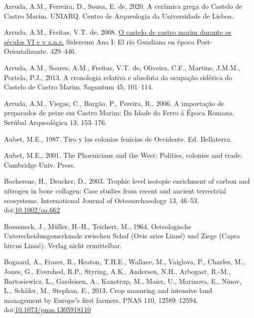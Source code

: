 \documentclass[review]{elsarticle} %
\newlength{\cslhangindent}
\newenvironment{CSLReferences}[2] %
 {%
  \setlength{\parindent}{0pt}
  \ifodd #1 \everypar{\setlength{\hangindent}{\cslhangindent}}\ignorespaces\fi
  \ifnum #2 > 0
  \setlength{\parskip}{#2\baselineskip}
  \fi
 }%
 {}
\begin{document}
\begin{CSLReferences}{1}{0}
\leavevmode{}%
Arruda, A.M., Ferreira, D., Sousa, E. de, 2020. A cerâmica grega do {Castelo} de {Castro Marim}. {UNIARQ. Centro de Arqueologia da Universidade de Lisboa}.

\leavevmode{}%
Arruda, A.M., Freitas, V.T. de, 2008. \href{https://repositorio.ul.pt/handle/10451/9778}{O castelo de castro marim durante os séculos VI e v a.n.e.} Sidereum Ana I: El río Guadiana en época Post-Orientalizante. 429--446.

\leavevmode{}%
Arruda, A.M., Soares, A.M., Freitas, V.T. de, Oliveira, C.F., Martins, J.M.M., Portela, P.J., 2013. A cronologia relativa e absoluta da ocupação sidérica do {Castelo} de {Castro Marim}. Saguntum 45, 101--114.

\leavevmode{}%
Arruda, A.M., Viegas, C., Bargão, P., Pereira, R., 2006. A importação de preparados de peixe em {Castro Marim}: Da {Idade} do {Ferro} á {Época Romana}. Setúbal Arqueológica 13, 153--176.

\leavevmode{}%
Aubet, M.E., 1987. Tiro y las colonias fenicias de {Occidente}. {Ed. Bellaterra}.

\leavevmode{}%
Aubet, M.E., 2001. The {Phoenicians} and the {West}: Politics, colonies and trade. {Cambridge Univ. Press}.

\leavevmode{}%
Bocherens, H., Drucker, D., 2003. Trophic level isotopic enrichment of carbon and nitrogen in bone collagen: Case studies from recent and ancient terrestrial ecosystems. International Journal of Osteoarchaeology 13, 46--53. doi:\href{https://doi.org/10.1002/oa.662}{10.1002/oa.662}

\leavevmode{}%
Boessneck, J., Müller, H.-H., Teichert, M., 1964. Osteologische {Unterscheidungsmerkmale} zwischen {Schaf} ({Ovis} aries {Linné}) und {Ziege} ({Capra} hircus {Linné}). {Verlag nicht ermittelbar}.

\leavevmode{}%
Bogaard, A., Fraser, R., Heaton, T.H.E., Wallace, M., Vaiglova, P., Charles, M., Jones, G., Evershed, R.P., Styring, A.K., Andersen, N.H., Arbogast, R.-M., Bartosiewicz, L., Gardeisen, A., Kanstrup, M., Maier, U., Marinova, E., Ninov, L., Schäfer, M., Stephan, E., 2013. Crop manuring and intensive land management by {Europe}'s first farmers. PNAS 110, 12589--12594. doi:\href{https://doi.org/10.1073/pnas.1305918110}{10.1073/pnas.1305918110}


\end{CSLReferences}
\end{document}
